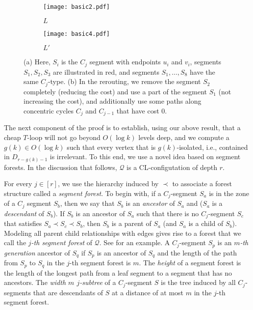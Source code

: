 \documentclass{article}
\numberwithin{claimcounter}{lemma}
\begin{document}
\begin{figure}
\centering
\begin{subfigure}{.5\textwidth}
  \centering
  \captionsetup{justification=centering}
  \texttt{[image: basic2.pdf]}
  \caption{$L$}
  \label{fig:O}
\end{subfigure}\begin{subfigure}{.5\textwidth}
  \centering
  \captionsetup{justification=centering}
  \texttt{[image: basic4.pdf]}
  \caption{$L'$}
  \label{fig:O2}
\end{subfigure}
\caption{(a) Here, $S_i$ is the $C_j$ segment with endpoints $u_i$ and $v_i$, segments $S_1,S_2,S_3$ are illustrated in red, and segments $S_1,\ldots,S_8$ have the same $C_j$-type. (b) In the rerouting, we remove the segment $S_2$ completely (reducing the cost) and use a part of the segment $S_1$ (not increasing the cost), and additionally use some paths along concentric cycles $C_j$ and $C_{j-1}$ that have cost 0.}
\label{fig:exchange}
\end{figure}





The next component of the proof is to establish, using our above result, that a cheap $T$-loop will not go beyond $O(\log k)$ levels deep, and we compute a $g(k)\in O(\log k)$ such that every vertex that is $g(k)$-isolated, i.e., contained in $D_{r-g(k)-1}$ is irrelevant. To this end, we use a novel idea based on segment forests. In the discussion that follows, $\mathcal{Q}$ is a CL-configutation of depth $r$.

 For every $j \in [r]$, we use the hierarchy induced by $\prec$ to associate a forest structure called a \emph{segment forest}. To begin with, if a $C_j$-segment $S_a$ is in the zone of a $C_j$ segment $S_b$, then we say that $S_b$ is an \emph{ancestor} of $S_a$ and ($S_a$ is a \emph{descendant} of $S_b$). If $S_b$ is an ancestor of $S_a$ such that there is no $C_j$-segment $S_c$ that satisfies $S_a \prec S_c \prec S_b$, then $S_b$ is a parent of $S_a$ (and $S_a$ is a child of $S_b$). Modeling all parent child relationships with edges gives rise to a forest that we call the \emph{$j$-th segment forest} of $\mathcal{Q}$. See  for an example. 
A $C_j$-segment $S_p$ is an \emph{$m$-th generation} ancestor of $S_q$ if $S_p$ is an ancestor of $S_q$ and the length of the path from $S_p$ to $S_q$ in the $j$-th segment forest is $m$.
The \emph{height} of a segment forest is the length of the longest path from a leaf segment to a segment that has no ancestors.
The \emph{width $m$ $j$-subtree} of a $C_j$-segment $S$ is the tree induced by all $C_j$-segments that are descendants of $S$ at a distance of at most $m$ in the $j$-th segment forest. 
\end{document}
